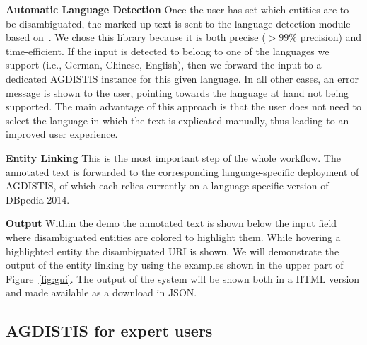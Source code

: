 \noindent\textbf{Automatic Language Detection}
Once the user has set which entities are to be disambiguated, the marked-up text is sent to the language detection module based on~\cite{nakatani2010langdetect}.
We chose this library because it is both precise ($>99\%$ precision) and time-efficient.
If the input is detected to belong to one of the languages we support (i.e., German, Chinese, English), then we forward the input to a dedicated AGDISTIS instance for this given language.
In all other cases, an error message is shown to the user, pointing towards the language at hand not being supported.
The main advantage of this approach is that the user does not need to select the language in which the text is explicated manually, thus leading to an improved user experience. 

\noindent\textbf{Entity Linking} 
This is the most important step of the whole workflow.
The annotated text is forwarded to the corresponding language-specific deployment of AGDISTIS, of which each relies currently on a language-specific version of DBpedia 2014. 

\noindent\textbf{Output}
Within the demo the annotated text is shown below the input field where disambiguated entities are colored to highlight them. 
While hovering a highlighted entity the disambiguated URI is shown.
We will demonstrate the output of the entity linking by using the examples shown in the upper part of Figure~\ref{fig:gui}. 
The output of the system will be shown both in a HTML version and made available as a download in JSON. 

\subsection{AGDISTIS for expert users}

